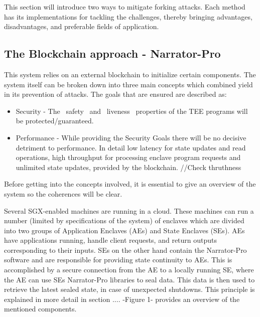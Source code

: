  
 This section will introduce two ways to mitigate forking attacks. Each method has its implementations for tackling the challenges, thereby bringing advantages, disadvantages, and preferable fields of application.

\subsection{The Blockchain approach - Narrator-Pro}

This system relies on an external blockchain to initialize certain components. The system itself can be broken down into three main concepts which combined yield in its prevention of attacks. The goals that are ensured are described as:
\begin{itemize}
     \item Security - The ~safety~ and ~liveness~ properties of the TEE programs will be protected/guaranteed.
     \item Performance - While providing the Security Goals there will be no decisive detriment to performance. In detail low latency for state updates and read operations, high throughput for processing enclave program requests and unlimited state updates, provided by the blockchain. //Check thruthness
\end{itemize} 
Before getting into the concepts involved, it is essential to give an overview of the system so the coherences will be clear.

Several SGX-enabled machines are running in a cloud. These machines can run a number (limited by specifications of the system) of enclaves which are divided into two groups of Application Enclaves (AEs) and State Enclaves (SEs). AEs have applications running, handle client requests, and return outputs corresponding to their inputs. SEs on the other hand contain the Narrator-Pro software and are responsible for providing state continuity to AEs. This is accomplished by a secure connection from the AE to a locally running SE, where the AE can use SEs Narrator-Pro libraries to seal data. This data is then used to retrieve the latest sealed state, in case of unexpected shutdowns. This principle is explained in more detail in section .... -Figure 1- provides an overview of the mentioned components.

